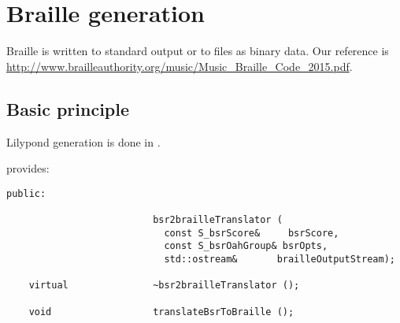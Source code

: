 



\chapter{Braille generation}


Braille is written to standard output or to files as binary data. Our reference is \url{http://www.brailleauthority.org/music/Music_Braille_Code_2015.pdf}.


\section{Basic principle}

Lilypond generation is done in .

 provides:
\begin{lstlisting}[language=CPlusPlus]
  public:

                          bsr2brailleTranslator (
                            const S_bsrScore&     bsrScore,
                            const S_bsrOahGroup& bsrOpts,
                            std::ostream&       brailleOutputStream);

    virtual               ~bsr2brailleTranslator ();

    void                  translateBsrToBraille ();
\end{lstlisting}

